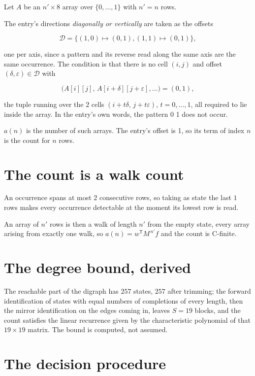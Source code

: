 \documentclass[11pt]{article}
\theoremstyle{definition}
\begin{document}
Let $A$ be an $n' \times 8$ array over $\{0,\dots,1\}$ with $n' = n$ rows.

The entry's directions {\itshape diagonally or vertically} are taken as the offsets

\[\mathcal{D} = \{(1,0)\mapsto(0,1), (1,1)\mapsto(0,1)\},\]

one per axis, since a pattern and its reverse read along the same axis are the same occurrence. The condition is that there is no cell $(i,j)$ and offset $(\delta,\varepsilon)\in\mathcal{D}$ with

\[\bigl(A[i][j],\,A[i{+}\delta][j{+}\varepsilon],\dots\bigr) = (0, 1),\]

the tuple running over the $2$ cells $(i+t\delta,\,j+t\varepsilon)$, $t = 0,\dots,1$, all required to lie inside the array. In the entry's own words, the pattern 0 1 does not occur.

$a(n)$ is the number of such arrays. The entry's offset is 1, so its term of index $n$ is the count for $n$ rows.

\section{The count is a walk count}

An occurrence spans at most $2$ consecutive rows, so taking as state the last $1$ rows makes every occurrence detectable at the moment its lowest row is read.

An array of $n'$ rows is then a walk of length $n'$ from the empty state, every array arising from exactly one walk, so $a(n) = w^{\mathsf T}M^{\,n'}f$ and the count is C-finite.

\section{The degree bound, derived}

The reachable part of the digraph has $257$ states, $257$ after trimming; the forward identification of states with equal numbers of completions of every length, then the mirror identification on the edges coming in, leaves $S = 19$ blocks, and the count satisfies the linear recurrence given by the characteristic polynomial of that $19\times19$ matrix. The bound is computed, not assumed.

\section{The decision procedure}
\end{document}
